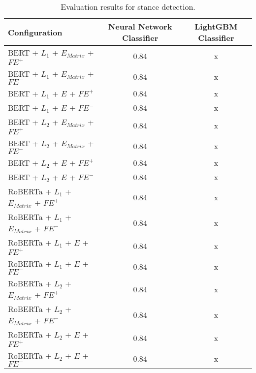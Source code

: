 \begin{table}[H]
  \begin{center}
  	\renewcommand{\arraystretch}{1.2}
   	\begin{tabular}{|| l || c | c ||}
   	\hline
   	{\small Configuration} & {\small Neural Network Classifier} & {\small LightGBM Classifier} \\
   	\hline\hline
   	BERT + $L_1$ + $E_{Matrix}$ + $\textit{FE}^+$ & 0.84 & x \\
 	\hline
 	BERT + $L_1$ + $E_{Matrix}$ + $\textit{FE}^-$ & 0.84 & x \\
 	\hline
 	BERT + $L_1$ + $E$ + $\textit{FE}^+$ & 0.84 & x \\
 	\hline
 	BERT + $L_1$ + $E$ + $\textit{FE}^-$ & 0.84 & x \\
 	\hline
 	BERT + $L_2$ + $E_{Matrix}$ + $\textit{FE}^+$ & 0.84 & x \\
 	\hline
 	BERT + $L_2$ + $E_{Matrix}$ + $\textit{FE}^-$ & 0.84 & x \\
 	\hline
 	BERT + $L_2$ + $E$ + $\textit{FE}^+$ & 0.84 & x \\
 	\hline
 	BERT + $L_2$ + $E$ + $\textit{FE}^-$ & 0.84 & x \\
 	\hline
 	RoBERTa + $L_1$ + $E_{Matrix}$ + $\textit{FE}^+$ & 0.84 & x \\
 	\hline
 	RoBERTa + $L_1$ + $E_{Matrix}$ + $\textit{FE}^-$ & 0.84 & x \\
 	\hline
 	RoBERTa + $L_1$ + $E$ + $\textit{FE}^+$ & 0.84 & x \\
 	\hline
 	RoBERTa + $L_1$ + $E$ + $\textit{FE}^-$ & 0.84 & x \\
 	\hline
 	RoBERTa + $L_2$ + $E_{Matrix}$ + $\textit{FE}^+$ & 0.84 & x \\
 	\hline
 	RoBERTa + $L_2$ + $E_{Matrix}$ + $\textit{FE}^-$ & 0.84 & x \\
 	\hline
 	RoBERTa + $L_2$ + $E$ + $\textit{FE}^+$ & 0.84 & x \\
 	\hline
 	RoBERTa + $L_2$ + $E$ + $\textit{FE}^-$ & 0.84 & x \\
 	\hline
	\end{tabular}
	\renewcommand{\arraystretch}{1}
  \end{center}
  \caption{Evaluation results for stance detection.}%
  \label{fig:stanceresults}
\end{table}